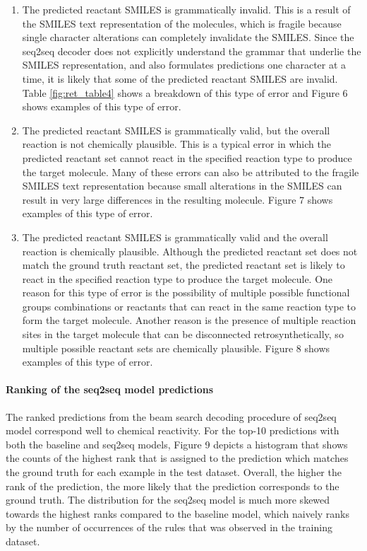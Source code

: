 \begin{enumerate}
    \item The predicted reactant SMILES is grammatically invalid. This is a result of the SMILES text representation of the molecules, which is fragile because single character alterations can completely invalidate the SMILES. Since the seq2seq decoder does not explicitly understand the grammar that underlie the SMILES representation, and also formulates predictions one character at a time, it is likely that some of the predicted reactant SMILES are invalid. Table \ref{fig:ret_table4} shows a breakdown of this type of error and Figure 6 shows examples of this type of error.
    \item The predicted reactant SMILES is grammatically valid, but the overall reaction is not chemically plausible. This is a typical error in which the predicted reactant set cannot react in the specified reaction type to produce the target molecule. Many of these errors can also be attributed to the fragile SMILES text representation because small alterations in the SMILES can result in very large differences in the resulting molecule. Figure 7 shows examples of this type of error.
    \item The predicted reactant SMILES is grammatically valid and the overall reaction is chemically plausible. Although the predicted reactant set does not match the ground truth reactant set, the predicted reactant set is likely to react in the specified reaction type to produce the target molecule. One reason for this type of error is the possibility of multiple possible functional groups combinations or reactants that can react in the same reaction type to form the target molecule. Another reason is the presence of multiple reaction sites in the target molecule that can be disconnected retrosynthetically, so multiple possible reactant sets are chemically plausible. Figure 8 shows examples of this type of error.
\end{enumerate}

\paragraph{Ranking of the seq2seq model predictions}

The ranked predictions from the beam search decoding procedure of seq2seq model correspond well to chemical reactivity. For the top-10 predictions with both the baseline and seq2seq models, Figure 9 depicts a histogram that shows the counts of the highest rank that is assigned to the prediction which matches the ground truth for each example in the test dataset. Overall, the higher the rank of the prediction, the more likely that the prediction corresponds to the ground truth. The distribution for the seq2seq model is much more skewed towards the highest ranks compared to the baseline model, which naively ranks by the number of occurrences of the rules that was observed in the training dataset. 


